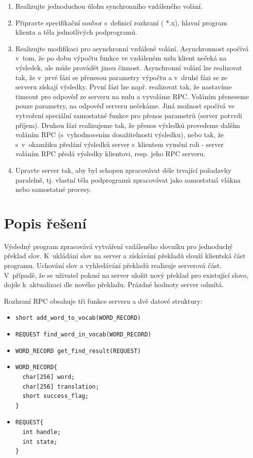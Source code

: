 \documentclass[12pt, a4paper]{article}
\begin{document}
\begin{enumerate}
\item Realizujte jednoduchou úlohu synchronního vzdáleného volání.
\item Připravte specifikační soubor s~definicí rozhraní ( *.x), hlavní program klienta a těla jednotlivých podprogramů. 
\item Realizujte modifikaci pro asynchronní vzdálené volání. Asynchronnost spočívá v~tom, že po dobu výpočtu funkce ve vzdáleném uzlu klient nečeká na výsledek, ale může provádět jinou činnost. Asynchronní volání lze realizovat tak, že v~prvé fázi se přenesou parametry výpočtu a v~druhé fázi se ze serveru získají výsledky. První fázi lze např. realizovat tak, že nastavíme timeout pro odpověď ze serveru na nulu a vyvoláme RPC. Voláním přeneseme pouze parametry, na odpověď serveru nečekáme. Jiná možnost spočívá ve vytvoření speciální samostatné funkce pro přenos parametrů (server potvrdí příjem). Druhou fázi realizujeme tak, že přenos výsledků provedeme dalším voláním RPC (s~vyhodnocením dosažitelnosti výsledku), nebo tak, že s~v~okamžiku předání výsledků server s~klientem vymění roli - server voláním RPC předá výsledky klientovi, resp. jeho RPC serveru.
\item Upravte server tak, aby byl schopen zpracovávat déle trvající požadavky paralelně, tj. vlastní těla podprogramů zpracovávat jako samostatná vlákna nebo samostatné procesy.
\end{enumerate}
\newpage

\section{Popis řešení}

Výsledný program zpracovává vytváření vzdáleného slovníku pro jednoduchý překlad slov. K~ukládání slov na server a získávání překladů slouží klientská část programu. Uchování slov a vyhledávání překladů realizuje serverová část. V~případě, že se uživatel pokusí na server uložit nový překlad pro existující slovo, dojde k~aktualizaci dle nového překladu. Prázdné hodnoty server odmítá.

Rozhraní RPC obsahuje tři funkce serveru a dvě datové struktury:
\begin{itemize}
\item \texttt{short add\_word\_to\_vocab(WORD\_RECORD)}
\item \texttt{REQUEST find\_word\_in\_vocab(WORD\_RECORD)}
\item \texttt{WORD\_RECORD get\_find\_result(REQUEST)}
\item 
\begin{verbatim}
WORD_RECORD{
  char[256] word;
  char[256] translation;
  short success_flag;
}
\end{verbatim} 
\item 
\begin{verbatim}
REQUEST{
  int handle;
  int state;
}
\end{verbatim} 
\end{itemize}
\end{document}

